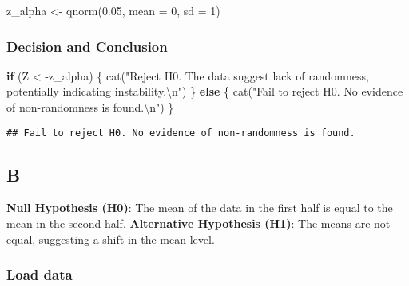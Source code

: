 \documentclass[
]{article}
\newenvironment{Shaded}{\begin{snugshade}}{\end{snugshade}}
\newcommand{\AttributeTok}[1]{\textcolor[rgb]{0.77,0.63,0.00}{#1}}
\newcommand{\ControlFlowTok}[1]{\textcolor[rgb]{0.13,0.29,0.53}{\textbf{#1}}}
\newcommand{\DecValTok}[1]{\textcolor[rgb]{0.00,0.00,0.81}{#1}}
\newcommand{\FloatTok}[1]{\textcolor[rgb]{0.00,0.00,0.81}{#1}}
\newcommand{\FunctionTok}[1]{\textcolor[rgb]{0.00,0.00,0.00}{#1}}
\newcommand{\NormalTok}[1]{#1}
\newcommand{\OtherTok}[1]{\textcolor[rgb]{0.56,0.35,0.01}{#1}}
\newcommand{\SpecialCharTok}[1]{\textcolor[rgb]{0.00,0.00,0.00}{#1}}
\newcommand{\StringTok}[1]{\textcolor[rgb]{0.31,0.60,0.02}{#1}}
\begin{document}
\begin{Shaded}
\begin{Highlighting}[]
\NormalTok{z\_alpha }\OtherTok{\textless{}{-}} \FunctionTok{qnorm}\NormalTok{(}\FloatTok{0.05}\NormalTok{, }\AttributeTok{mean =} \DecValTok{0}\NormalTok{, }\AttributeTok{sd =} \DecValTok{1}\NormalTok{)}
\end{Highlighting}
\end{Shaded}

\hypertarget{decision-and-conclusion-1}{%
\subsubsection{Decision and
Conclusion}\label{decision-and-conclusion-1}}

\begin{Shaded}
\begin{Highlighting}[]
\ControlFlowTok{if}\NormalTok{ (Z }\SpecialCharTok{\textless{}} \SpecialCharTok{{-}}\NormalTok{z\_alpha) \{}
  \FunctionTok{cat}\NormalTok{(}\StringTok{"Reject H0. The data suggest lack of randomness, potentially indicating instability.}\SpecialCharTok{\textbackslash{}n}\StringTok{"}\NormalTok{)}
\NormalTok{\} }\ControlFlowTok{else}\NormalTok{ \{}
  \FunctionTok{cat}\NormalTok{(}\StringTok{"Fail to reject H0. No evidence of non{-}randomness is found.}\SpecialCharTok{\textbackslash{}n}\StringTok{"}\NormalTok{)}
\NormalTok{\}}
\end{Highlighting}
\end{Shaded}

\begin{verbatim}
## Fail to reject H0. No evidence of non-randomness is found.
\end{verbatim}

\hypertarget{b}{%
\subsection{B}\label{b}}

\textbf{Null Hypothesis (H0)}: The mean of the data in the first half is
equal to the mean in the second half. \textbf{Alternative Hypothesis
(H1)}: The means are not equal, suggesting a shift in the mean level.

\hypertarget{load-data-11}{%
\subsubsection{Load data}\label{load-data-11}}
\end{document}
